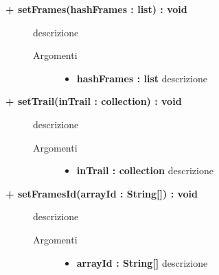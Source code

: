 \begin{description}
	
	\begin{description}
		\item[\textbf{\color{blue}+ setFrames(hashFrames : list) : void			}] \hfill
			descrizione %
			
		\begin{description}
			\item[Argomenti] \hfill
				\begin{itemize}
				
					\item \textbf{hashFrames : list			} \hfill
					descrizione %
					
				\end{itemize}
		\end{description}
	\end{description}
	
	\begin{description}
		\item[\textbf{\color{blue}+ setTrail(inTrail : collection) : void			}] \hfill
			descrizione %
			
		\begin{description}
			\item[Argomenti] \hfill
				\begin{itemize}
				
					\item \textbf{inTrail : collection			} \hfill
					descrizione %
					
				\end{itemize}
		\end{description}
	\end{description}
	
	\begin{description}
		\item[\textbf{\color{blue}+ setFramesId(arrayId : String[]) : void			}] \hfill
			descrizione %
			
		\begin{description}
			\item[Argomenti] \hfill
				\begin{itemize}
				
					\item \textbf{arrayId : String[]			} \hfill
					descrizione %
					

\end{itemize}
\end{description}
\end{description}
\end{description}
